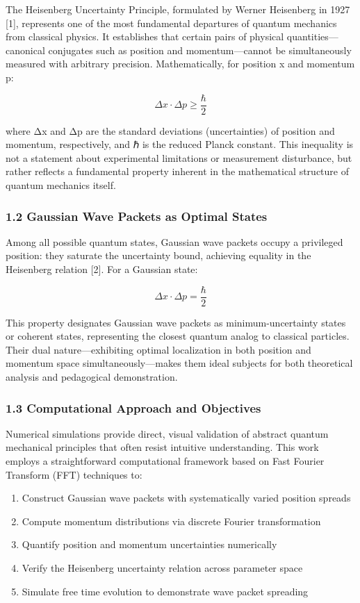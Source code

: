 \documentclass[
]{article}
\providecommand{\tightlist}{%
  \setlength{\itemsep}{0pt}\setlength{\parskip}{0pt}}
\begin{document}
The Heisenberg Uncertainty Principle, formulated by Werner Heisenberg in
1927 {[}1{]}, represents one of the most fundamental departures of
quantum mechanics from classical physics. It establishes that certain
pairs of physical quantities---canonical conjugates such as position and
momentum---cannot be simultaneously measured with arbitrary precision.
Mathematically, for position x and momentum p:

\[\Delta x \cdot \Delta p \geq \frac{\hbar}{2}\]

where Δx and Δp are the standard deviations (uncertainties) of position
and momentum, respectively, and ℏ is the reduced Planck constant. This
inequality is not a statement about experimental limitations or
measurement disturbance, but rather reflects a fundamental property
inherent in the mathematical structure of quantum mechanics itself.

\subsubsection{1.2 Gaussian Wave Packets as Optimal
States}\label{gaussian-wave-packets-as-optimal-states}

Among all possible quantum states, Gaussian wave packets occupy a
privileged position: they saturate the uncertainty bound, achieving
equality in the Heisenberg relation {[}2{]}. For a Gaussian state:

\[\Delta x \cdot \Delta p = \frac{\hbar}{2}\]

This property designates Gaussian wave packets as minimum-uncertainty
states or coherent states, representing the closest quantum analog to
classical particles. Their dual nature---exhibiting optimal localization
in both position and momentum space simultaneously---makes them ideal
subjects for both theoretical analysis and pedagogical demonstration.

\subsubsection{1.3 Computational Approach and
Objectives}\label{computational-approach-and-objectives}

Numerical simulations provide direct, visual validation of abstract
quantum mechanical principles that often resist intuitive understanding.
This work employs a straightforward computational framework based on
Fast Fourier Transform (FFT) techniques to:

\begin{enumerate}
\def\labelenumi{\arabic{enumi}.}
\tightlist
\item
  Construct Gaussian wave packets with systematically varied position
  spreads
\item
  Compute momentum distributions via discrete Fourier transformation
\item
  Quantify position and momentum uncertainties numerically
\item
  Verify the Heisenberg uncertainty relation across parameter space
\item
  Simulate free time evolution to demonstrate wave packet spreading
\end{enumerate}
\end{document}
